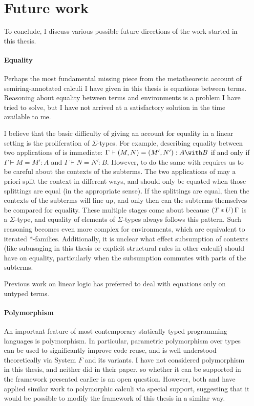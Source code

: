 \section{Future work}

To conclude, I discuss various possible future directions of the work started in
this thesis.

\paragraph{Equality}
Perhaps the most fundamental missing piece from the metatheoretic account of
semiring-annotated calculi I have given in this thesis is equations between
terms.
Reasoning about equality between terms and environments is a problem I have
tried to solve, but I have not arrived at a satisfactory solution in the time
available to me.

I believe that the basic difficulty of giving an account for equality in a
linear setting is the proliferation of $\Sigma$-types.
For example, describing equality between two applications of
 is immediate: $\Gamma \vdash (M, N) = (M', N') : A \with B$
if and only if $\Gamma \vdash M = M' : A$ and $\Gamma \vdash N = N' : B$.
However, to do the same with  requires us to be careful
about the contexts of the subterms.
The two applications of  may a priori split the context in
different ways, and should only be equated when those splittings are equal
(in the appropriate sense).
If the splittings are equal, then the contexts of the subterms will line up, and
only then can the subterms themselves be compared for equality.
These multiple stages come about because $\plr{T * U}\,\Gamma$ is a
$\Sigma$-type, and equality of elements of $\Sigma$-types always follows this
pattern.
Such reasoning becomes even more complex for environments, which are equivalent
to iterated $*$-families.
Additionally, it is unclear what effect subsumption of contexts (like subusaging
in this thesis or explicit structural rules in other calculi) should have on
equality, particularly when the subsumption commutes with parts of the subterms.

Previous work on linear logic has preferred to deal with equations only on
untyped terms. 

\paragraph{Polymorphism}
An important feature of most contemporary statically typed programming languages
is polymorphism.
In particular, parametric polymorphism over types can be used to significantly
improve code reuse, and is well understood theoretically via System $F$ and its
variants.
I have not considered polymorphism in this thesis, and neither did
\citet{AACMM21} in their paper, so whether it can be supported in the framework
presented earlier is an open question.
However, both \citet{Autosubst15} and \citet{Autosubst18} have applied similar
work to polymorphic calculi via special support, suggesting that it would be
possible to modify the framework of this thesis in a similar way.

